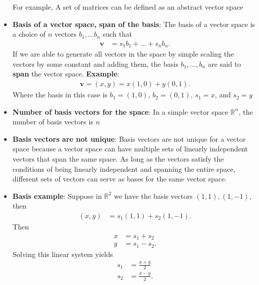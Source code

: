 \documentclass{report}
\begin{document}
\begin{itemize}
            \bigbreak \noindent 
            For example, A set of matrices can be defined as an abstract vector space
        \item \textbf{Basis of a vector space, span of the basis}: The basis of a vector space is a choice of $n$ vectors $b_{1},...b_{n}$ such that
            \begin{align*}
                \mathbf{v} &= s_{1}b_{1} + ...  + s_{n}b_{n}
            .\end{align*}
            \bigbreak \noindent 
            If we are able to generate all vectors in the space by simple scaling the vectors by some constant and adding them, the basis $b_{1}, ...,b_{n} $ are said to \textbf{span} the vector space.
            \bigbreak \noindent 
            \textbf{Example}:
            \begin{align*}
                \mathbf{v} = (x,y) = x(1,0) + y(0,1)
            .\end{align*}
            Where  the basis in this case is $b_{1} = (1,0)$, $b_{2} = (0,1)$, $s_{1} = x$, and $s_{2} = y$
        \item \textbf{Number of basis vectors for the space}: In a simple vector space $\mathbb{R}^{n}$, the number of basis vectors is $n$
        \item \textbf{Basis vectors are not unique}: Basis vectors are not unique for a vector space because a vector space can have multiple sets of linearly independent vectors that span the same space. As long as the vectors satisfy the conditions of being linearly independent and spanning the entire space, different sets of vectors can serve as bases for the same vector space.
        \item \textbf{Basis example}: Suppose in $\mathbb{R}^{2}$ we have the basis vectors $(1,1),(1,-1)$, then
            \begin{align*}
                (x,y) &= s_1(1,1) + s_2(1,-1)
            .\end{align*}
            Then
            \begin{align*}
                x &= s_1 + s_2 \\
                y&=s_1 - s_2
            .\end{align*}
            Solving this linear system yields
            \begin{align*}
                s_1 &= \frac{x + y}{2} \\
                s_2 &= \frac{x-y}{2}
            .\end{align*}
            \bigbreak \noindent 

\end{itemize}
\end{document}

